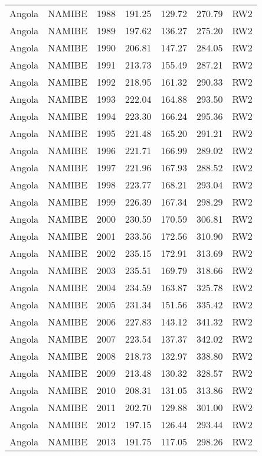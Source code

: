 \begin{longtable}{lllrrrl}
  Angola & NAMIBE & 1988 & 191.25 & 129.72 & 270.79 & RW2 \\ 
  Angola & NAMIBE & 1989 & 197.62 & 136.27 & 275.20 & RW2 \\ 
  Angola & NAMIBE & 1990 & 206.81 & 147.27 & 284.05 & RW2 \\ 
  Angola & NAMIBE & 1991 & 213.73 & 155.49 & 287.21 & RW2 \\ 
  Angola & NAMIBE & 1992 & 218.95 & 161.32 & 290.33 & RW2 \\ 
  Angola & NAMIBE & 1993 & 222.04 & 164.88 & 293.50 & RW2 \\ 
  Angola & NAMIBE & 1994 & 223.30 & 166.24 & 295.36 & RW2 \\ 
  Angola & NAMIBE & 1995 & 221.48 & 165.20 & 291.21 & RW2 \\ 
  Angola & NAMIBE & 1996 & 221.71 & 166.99 & 289.02 & RW2 \\ 
  Angola & NAMIBE & 1997 & 221.96 & 167.93 & 288.52 & RW2 \\ 
  Angola & NAMIBE & 1998 & 223.77 & 168.21 & 293.04 & RW2 \\ 
  Angola & NAMIBE & 1999 & 226.39 & 167.34 & 298.29 & RW2 \\ 
  Angola & NAMIBE & 2000 & 230.59 & 170.59 & 306.81 & RW2 \\ 
  Angola & NAMIBE & 2001 & 233.56 & 172.56 & 310.90 & RW2 \\ 
  Angola & NAMIBE & 2002 & 235.15 & 172.91 & 313.69 & RW2 \\ 
  Angola & NAMIBE & 2003 & 235.51 & 169.79 & 318.66 & RW2 \\ 
  Angola & NAMIBE & 2004 & 234.59 & 163.87 & 325.78 & RW2 \\ 
  Angola & NAMIBE & 2005 & 231.34 & 151.56 & 335.42 & RW2 \\ 
  Angola & NAMIBE & 2006 & 227.83 & 143.12 & 341.32 & RW2 \\ 
  Angola & NAMIBE & 2007 & 223.54 & 137.37 & 342.02 & RW2 \\ 
  Angola & NAMIBE & 2008 & 218.73 & 132.97 & 338.80 & RW2 \\ 
  Angola & NAMIBE & 2009 & 213.48 & 130.32 & 328.57 & RW2 \\ 
  Angola & NAMIBE & 2010 & 208.31 & 131.05 & 313.86 & RW2 \\ 
  Angola & NAMIBE & 2011 & 202.70 & 129.88 & 301.00 & RW2 \\ 
  Angola & NAMIBE & 2012 & 197.15 & 126.44 & 293.44 & RW2 \\ 
  Angola & NAMIBE & 2013 & 191.75 & 117.05 & 298.26 & RW2 \\ 

\end{longtable}
